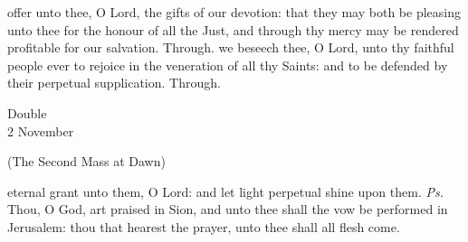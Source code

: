 \secret
{} offer unto thee, O Lord, the gifts of our devotion: that they may both be pleasing unto thee for the honour of all the Just, and through thy mercy may be rendered profitable for our salvation. Through.
\postcommunion
{} we beseech thee, O Lord, unto thy faithful people ever to rejoice in the veneration of all thy Saints: and to be defended by their perpetual supplication. Through.

\label{AllSouls}
\begin{inhead}
    {Double\\
2 November}
\end{inhead}

\centerline{\small{(The Second Mass at Dawn)}}


\introit
{} eternal grant unto them, O Lord: and let light perpetual shine upon them. \textit{Ps.} Thou, O God, art praised in Sion, and unto thee shall the vow be performed in Jerusalem: thou that hearest the prayer, unto thee shall all flesh come.

